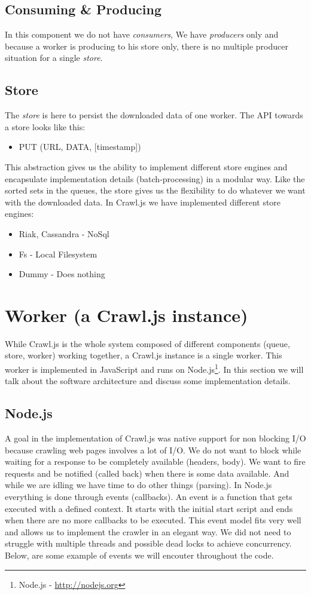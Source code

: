 \subsection{Consuming \& Producing}
In this component we do not have \emph{consumers}, We have \emph{producers} only and because a worker is producing to his store only, there is no multiple producer situation for a single \emph{store}.

\subsection{Store}
The \emph{store} is here to persist the downloaded data of one worker. The API towards a store looks like this:
\begin{itemize}
  \item PUT (URL, DATA, [timestamp])
\end{itemize}
This abstraction gives us the ability to implement different store engines and encapsulate implementation details (batch-processing) in a modular way. Like the sorted sets in the queues, the store gives us the flexibility to do whatever we want with the downloaded data. In Crawl.js we have implemented different store engines:
\begin{itemize}
  \item Riak, Cassandra - NoSql
  \item Fs - Local Filesystem
  \item Dummy - Does nothing
\end{itemize}

\section{Worker (a Crawl.js instance)}
\label{worker}
While Crawl.js is the whole system composed of different components (queue, store, worker) working together, a Crawl.js instance is a single worker. This worker is implemented in JavaScript and runs on Node.js\footnote{Node.js - \url{http://nodejs.org}}.
In this section we will talk about the software architecture and discuss some implementation details.

\subsection{Node.js}
A goal in the implementation of Crawl.js was native support for non blocking I/O because crawling web pages involves a lot of I/O. We do not want to block while waiting for a response to be completely available (headers, body). We want to fire requests and be notified (called back) when there is some data available. And while we are idling we have time to do other things (parsing). In Node.js everything is done through events (callbacks). An event is a function that gets executed with a defined context. It starts with the initial start script and ends when there are no more callbacks to be executed. This event model fits very well and allows us to implement the crawler in an elegant way. We did not need to struggle with multiple threads and possible dead locks to achieve concurrency. Below, are some example of events we will encouter throughout the code.

